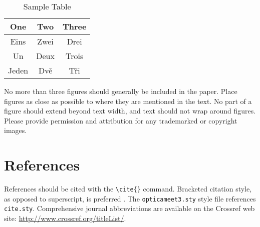 \documentclass[letterpaper, 10pt]{article}
\begin{document}
\begin{table}[htb]
 \centering \caption{Sample Table}
\begin{tabular}{ccc}
    \hline
    One & Two & Three \\
    \hline
    Eins & Zwei & Drei \\
    Un & Deux & Trois \\
    Jeden & Dv\v{e} & T\v{r}i \\
    \hline
   \end{tabular}
    \end{table}

No more than three figures should generally be included in the paper. Place figures as close as possible to where they
are mentioned in the text. No part of a figure should extend beyond text width, and text should not wrap around figures. Please provide permission and attribution for any trademarked or copyright images.

\section{References}
References should be cited with the \verb+\cite{}+ command.
Bracketed citation style, as opposed to superscript, is preferred
\cite{Chirwa18,Chu18,masters93,shoop97,kalman76,craig96,steup96}.
The \texttt{opticameet3.sty} style file references \texttt{cite.sty}. Comprehensive journal abbreviations are available on the Crossref web site:
\href{http://www.crossref.org/titleList/}{http://www.crossref.org/titleList/}.
\end{document}
